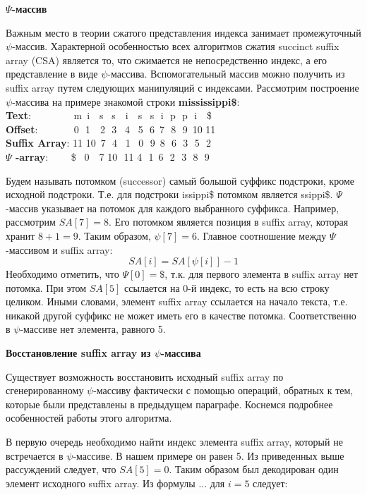 \textbf{$\Psi$-массив}

Важным место в теории сжатого представления индекса занимает промежуточный $\psi$-массив.
Характерной особенностью всех алгоритмов сжатия succinct suffix array (CSA)
является то, что сжимается не непосредственно индекс, а его представление
в виде $\psi$-массива. Вспомогательный массив можно получить из suffix array путем следующих манипуляций с индексами.
\newpage
Рассмотрим построение $\psi$-массива на примере знакомой строки \textbf{mississippi\$}:
\\ \textbf{Text}:\,\,\,\,\,\,\,\,\,\,\,\,\,\,\,\,\,\,\,\,\,\,\,\, m \,i \,\,\,\,s \,\,\,s \,\,\,\,i \,\,\,\,s \,\,\,s \,\,i \,\,p \,\,p \,\,i \,\,\,\,\$
\\ \textbf{Offset}:\,\,\,\,\,\,\,\,\,\,\,\,\,\,\,\,\,\,\,\, 0 \,\,1 \,\,\,\,2 \,\,3 \,\,\,4 \,\,\,5 \,\,6 \,7 \,\,8 \,\,9 \,10 11
\\ \textbf{Suffix Array}:   11 10 \,7 \,\,4 \,\,\,1 \,\,\,0 \,\,9 \,8 \,\,6 \,\,3 \,\,5 \,\,2
\\ \textbf{$\Psi$ -array}: \,\,\,\,\,\,\,\,\,\,\,\,\$ \,\,\,0 \,\,\,\,7 10 \,\,11 4 \,\,1 \,6 \,\,2 \,\,3 \,\,8 \,\,9

Будем называть потомком (successor) самый большой суффикс подстроки, кроме исходной подстроки.
Т.е. для подстроки issippi\$ потомком является ssippi\$.
$\Psi$-массив указывает на потомок для каждого выбранного суффикса.
Например, рассмотрим $SA[7] = 8$. Его потомком является позиция в suffix array, которая хранит $8 + 1 = 9$.
Таким образом, $\psi[7] = 6$. Главное соотношение между $\Psi$-массивом и suffix array:
\[SA[i] = SA[\psi[i]] - 1\]
Необходимо отметить, что $\Psi[0] = \$$, т.к. для первого элемента в suffix array нет потомка.
При этом $SA[5]$ ссылается на 0-й индекс, то есть на всю строку целиком.
Иными словами, элемент suffix array ссылается на начало текста,
т.е. никакой другой суффикс не может иметь его в качестве потомка.
Соответственно в $\psi$-массиве нет элемента, равного 5.

\textbf{Восстановление suffix array из $\psi$-массива}

Существует возможность восстановить исходный suffix array по сгенерированному $\psi$-массиву
фактически с помощью операций, обратных к тем, которые были представлены в предыдущем параграфе.
Коснемся подробнее особенностей работы этого алгоритма.

В первую очередь необходимо найти индекс элемента suffix array, который не встречается в $\psi$-массиве.
В нашем примере он равен 5. Из приведенных выше рассуждений следует, что $SA[5] = 0$.
Таким образом был декодирован один элемент исходного suffix array. Из формулы ... для $i = 5$ следует:

